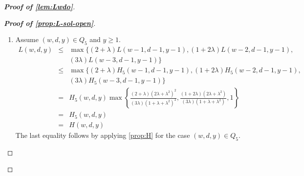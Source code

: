 \documentclass[10pt,a4paper]{article}
\newtheorem{lemma}{Lemma}
\newcommand{\trn}{\tau}
\newcommand{\total}{\sigma}
\newcommand{\openinteger}{y}
\begin{document}
\begin{proof}[\textbf{Proof of \cref{lem:Lwdo}}]
\begin{proof}[\textbf{Proof of \cref{prop:L-sol-open}}]
\begin{enumerate}[label=\textbf{Case \arabic*:}, itemindent=*, leftmargin=0em]
\item Assume $(w, d, \openinteger)\in Q_5$ and $\openinteger \ge 1$.
\begin{eqnarray*}
L(w, d, \openinteger) & \leq & \max\{(2+\lambda)L(w-1, d-1, \openinteger-1), (1+2\lambda)L(w-2, d-1, \openinteger-1), \\
& & (3\lambda)L(w-3, d-1, \openinteger-1)\}\\
& \le & \max\{(2+\lambda)H_5(w-1, d-1, \openinteger-1), (1+2\lambda)H_5(w-2, d-1, \openinteger-1), \\
& & (3\lambda)H_5(w-3, d-1, \openinteger-1)\}\\
& = & H_5(w, d, \openinteger)\max\left\{\frac{(2+\lambda)(2\lambda+\lambda^2)^2}{(3\lambda)(1+\lambda+\lambda^2)^2},
                             \frac{(1+2\lambda)(2\lambda+\lambda^2)}{(3\lambda)(1+\lambda+\lambda^2)}, 1 \right\}\\
& = & H_5(w, d, \openinteger)\\
& = & H(w, d, \openinteger)
\end{eqnarray*}
The last equality follows by applying \cref{prop:H} for the case $(w, d,\openinteger)\in Q_5$.

\end{enumerate}

\end{proof}

\end{proof}



























\end{document}
